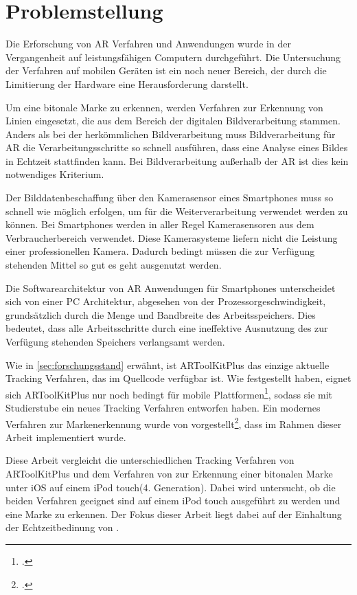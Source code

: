 \section{Problemstellung} %
\label{sec:problemstellung}
\begin{comment}
	Problemstellung: Problemstellung und Frage im Detail erläutern
\end{comment}

Die Erforschung von \gls{AR} Verfahren und Anwendungen wurde in der Vergangenheit auf leistungsfähigen Computern
 durchgeführt. Die Untersuchung der Verfahren auf mobilen Geräten ist ein noch neuer Bereich, der durch die Limitierung
 der Hardware eine Herausforderung darstellt.

Um eine bitonale Marke zu erkennen, werden Verfahren zur Erkennung von Linien eingesetzt, die aus dem Bereich der
 digitalen Bildverarbeitung stammen. Anders als bei der herkömmlichen Bildverarbeitung muss Bildverarbeitung für
 \gls{AR} die Verarbeitungsschritte so schnell ausführen, dass eine Analyse eines Bildes in Echtzeit stattfinden kann.
 Bei Bildverarbeitung außerhalb der \gls{AR} ist dies kein notwendiges Kriterium.

Der Bilddatenbeschaffung über den Kamerasensor eines Smartphones muss so schnell wie möglich erfolgen, um für die
 Weiterverarbeitung verwendet werden zu können. Bei Smartphones werden in aller Regel Kamerasensoren aus dem
 Verbraucherbereich verwendet. Diese Kamerasysteme liefern nicht die Leistung einer professionellen Kamera. Dadurch
 bedingt müssen die zur Verfügung stehenden Mittel so gut es geht ausgenutzt werden.

Die Softwarearchitektur von \gls{AR} Anwendungen für Smartphones unterscheidet sich von einer PC Architektur, abgesehen
 von der Prozessorgeschwindigkeit, grundsätzlich durch die Menge und Bandbreite des Arbeitsspeichers. Dies bedeutet,
 dass alle Arbeitsschritte durch eine ineffektive Ausnutzung des zur Verfügung stehenden Speichers verlangsamt werden.

Wie in \autoref{sec:forschungsstand} erwähnt, ist ARToolKitPlus das einzige aktuelle Tracking Verfahren, das im
 Quellcode verfügbar ist. Wie \citeauthor{wagner09a} festgestellt haben, eignet sich ARToolKitPlus nur noch bedingt für
 mobile Plattformen\footcite{wagner09a}, sodass sie mit Studierstube ein neues Tracking Verfahren entworfen haben. Ein
 modernes Verfahren zur Markenerkennung wurde von \citeauthor{hirzer08} vorgestellt\footcite{hirzer08}, dass im Rahmen
 dieser Arbeit implementiert wurde.

Diese Arbeit vergleicht die unterschiedlichen Tracking Verfahren von ARToolKitPlus und dem Verfahren von
 \citeauthor{hirzer08} zur Erkennung einer bitonalen Marke unter iOS auf einem iPod
 touch\textregistered (4. Generation). Dabei wird untersucht, ob die beiden Verfahren geeignet sind auf einem iPod
 touch ausgeführt zu werden und eine Marke zu erkennen. Der Fokus dieser Arbeit liegt dabei auf der Einhaltung der
 Echtzeitbedinung von \citeauthor{azuma97}.

